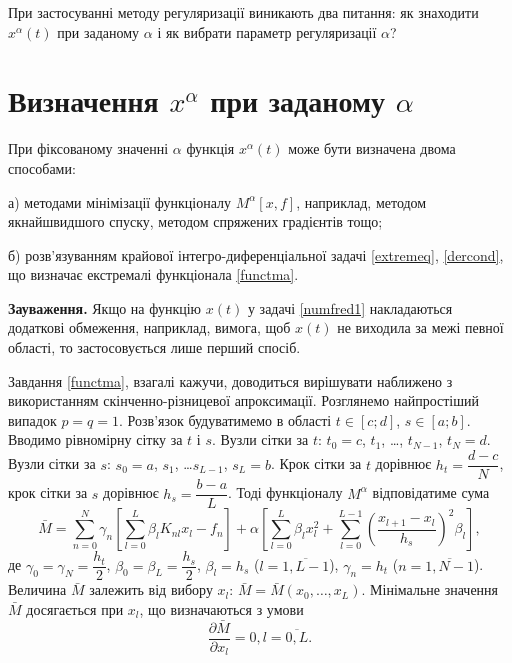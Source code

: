 \documentclass[14pt,twoside]{extreport}
\theoremstyle{mystyle}
\numberwithin{equation}{chapter}
\begin{document}
При застосуванні методу регуляризації виникають два питання: як знаходити $x^{\alpha}(t)$ при заданому $\alpha$ і як вибрати параметр регуляризації $\alpha$?

\section{Визначення \texorpdfstring{$x^{\alpha}$}{x alpha} при заданому \texorpdfstring{$\alpha$}{alpha}}

При фіксованому значенні $\alpha$ функція $x^{\alpha}(t)$ може бути визначена двома способами:

а) методами мінімізації функціоналу $M^{\alpha}[x, f]$, наприклад, методом якнайшвидшого спуску, методом спряжених градієнтів тощо;

б) розв'язуванням крайової інтегро-диференціальної задачі \eqref{extremeq}, \eqref{dercond}, що визначає екстремалі функціонала \eqref{functma}.

\textbf{Зауваження.} Якщо на функцію $x(t)$ у задачі \eqref{numfred1} накладаються додаткові обмеження, наприклад, вимога, щоб $x(t)$ не виходила за межі певної області, то застосовується лише перший спосіб.

Завдання \eqref{functma}, взагалі кажучи, доводиться вирішувати наближено з використанням скінченно-різницевої апроксимації. Розглянемо найпростіший випадок $p= q = 1$. Розв'язок будуватимемо в області $t \in [c; d]$, $s\in [a; b]$. Вводимо рівномірну сітку за $t$ і $s$. Вузли сітки за $t$: $t_0=c$, $t_1$, \ldots, $t_{N-1}$, $t_N = d$. Вузли сітки за $s$: $s_0 = a$, $s_1$, \ldots $s_{L-1}$, $s_L=b$. Крок сітки за $t$ дорівнює $h_t=\dfrac{d-c}{N}$, крок сітки за $s$ дорівнює $h_s=\dfrac{b-a}{L}$. Тоді функціоналу $M^{\alpha}$ відповідатиме сума
\begin{equation}\label{discrma}
 \bar{M} = \sum\limits_{n=0}^{N}\gamma_n\left[\sum\limits_{l=0}^{L} \beta_l K_{nl} x_l - f_n\right] + \alpha \left[\sum_{l=0}^{L} \beta_l x_l^2 + \sum_{l=0}^{L-1} \left(\dfrac{x_{l+1}-x_l}{h_s}\right)^2\beta_l\right],
\end{equation}
де $\gamma_0 = \gamma_N = \dfrac{h_t}{2}$, $\beta_0=\beta_L = \dfrac{h_s}{2}$, $\beta_l = h_s$ ($l=\overline{1, L-1}$), $\gamma_n= h_t$ ($n=\overline{1, N-1}$). Величина $\bar{M}$ залежить від вибору $x_l$: $\bar{M} = \bar{M}(x_0, \ldots, x_L)$.  Мінімальне значення $\bar{M}$ досягається при $x_l$, що визначаються з умови
\begin{equation}\label{macond}
 \dfrac{\partial \bar{M}}{\partial x_l} = 0, l=\overline{0, L}.
\end{equation}
\end{document}
